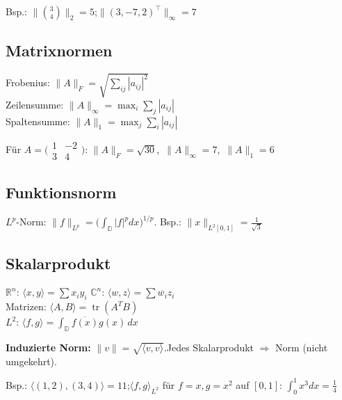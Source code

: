 \documentclass[10pt,a4paper,twocolumn]{article}
\newcommand{\detail}[1]{{\small\color{detail}#1}}
\begin{document}
	\detail{Bsp.: $\|\binom{3}{4}\|_2=5$;\quad $\|(3,-7,2)^\top\|_\infty=7$}
	
	\subsection{Matrixnormen}
	
	\begin{tcolorbox}[defbox, title={Matrixnormen}]
		Frobenius: $\|A\|_F=\sqrt{\sum_{ij}|a_{ij}|^2}$\\
		Zeilensumme: $\|A\|_\infty=\max_i\sum_j|a_{ij}|$\\
		Spaltensumme: $\|A\|_1=\max_j\sum_i|a_{ij}|$
	\end{tcolorbox}
	
	\detail{Für $A=\bigl(\begin{smallmatrix}1&-2\\3&4\end{smallmatrix}\bigr)$: $\|A\|_F=\sqrt{30}$,\ $\|A\|_\infty=7$,\ $\|A\|_1=6$}
	
	\subsection{Funktionsnorm}
	\detail{$L^p$-Norm: $\|f\|_{L^p}=\bigl(\int_\mathbb{D}|f|^p dx\bigr)^{1/p}$. \quad Bsp.: $\|x\|_{L^2[0,1]}=\frac{1}{\sqrt{3}}$}
	
	\subsection{Skalarprodukt}
	
	\begin{tcolorbox}[defbox, title={Skalarprodukte}]
		$\mathbb{R}^n$: $\langle x,y\rangle=\sum x_iy_i$\quad
		$\mathbb{C}^n$: $\langle w,z\rangle=\sum\overline{w_i}z_i$\\
		Matrizen: $\langle A,B\rangle=\operatorname{tr}(A^TB)$\\
		$L^2$: $\langle f,g\rangle=\int_\mathbb{D}\overline{f(x)}g(x)\,dx$
	\end{tcolorbox}
	
	\begin{tcolorbox}[tipbox]
		\textbf{Induzierte Norm:} $\|v\|=\sqrt{\langle v,v\rangle}$.\quad Jedes Skalarprodukt $\Rightarrow$ Norm (nicht umgekehrt).
	\end{tcolorbox}
	
	\detail{Bsp.: $\langle(1,2),(3,4)\rangle=11$;\quad $\langle f,g\rangle_{L^2}$ für $f=x,g=x^2$ auf $[0,1]$: $\int_0^1 x^3dx=\frac{1}{4}$}
	
\end{document}
